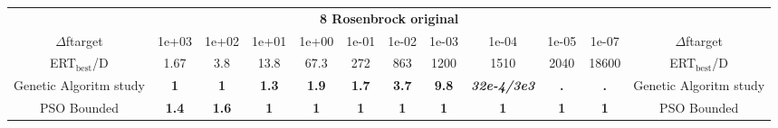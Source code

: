 \begin{tabular}{cccccccccccc}
 & \multicolumn{10}{c}{{\normalsize \textbf{8 Rosenbrock original}}}\\
$\Delta$ftarget& 1e+03& 1e+02& 1e+01& 1e+00& 1e-01& 1e-02& 1e-03& 1e-04& 1e-05& 1e-07 & $\Delta$ftarget \\
ERT$_{\textrm{best}}$/D& 1.67& 3.8& 13.8& 67.3& 272& 863& 1200& 1510& 2040& 18600 & ERT$_{\textrm{best}}$/D \\
\hline
Genetic Algoritm study & \textbf{1} & \textbf{1} & \textbf{1.3} & \textbf{1.9} & \textbf{1.7} & \textbf{3.7} & \textbf{9.8} & \textbf{\textit{32e-4}\textit{/3e3}} & \textbf{.} & \textbf{.} & Genetic Algoritm study \cite{add_an_entry_for_Genetic Algoritm study_in_bbob.bib}\\
PSO Bounded & \textbf{1.4} & \textbf{1.6} & \textbf{1} & \textbf{1} & \textbf{1} & \textbf{1} & \textbf{1} & \textbf{1} & \textbf{1} & \textbf{1} & PSO Bounded \cite{add_an_entry_for_PSO Bounded_in_bbob.bib}
\end{tabular}
